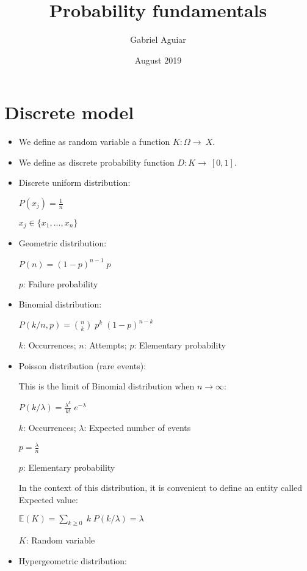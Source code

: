 \documentclass{article}
\title{Probability fundamentals}
\author{Gabriel Aguiar}
\date{August 2019}
\begin{document}
\maketitle

\section{Discrete model}

\begin{itemize}

\item We define as random variable a function $K: \Omega \rightarrow\ X$.

\item We define as discrete probability function $D: K \rightarrow\ [0, 1]$.

\item Discrete uniform distribution:

$P( x_{j} ) = \frac{1}{n}$

$x_{j} \in\{x_{1},..., x_{n}\}$

\item Geometric distribution:

$P(n) = (1 - p)^{n - 1} \; p$

$p$: Failure probability

\item Binomial distribution:

$P(k/n,p) = \binom{n}{k} \; p^{k} \; (1 - p)^{n - k}$

$k$: Occurrences; $n$: Attempts; $p$: Elementary probability

\item Poisson distribution (rare events):

This is the limit of Binomial distribution when $n \rightarrow \infty$:

$P(k/\lambda) = \frac{\lambda^{k}}{k!} \; e^{-\lambda}$

$k$: Occurrences; $\lambda$: Expected number of events

$p = \frac{\lambda}{n}$

$p$: Elementary probability

In the context of this distribution, it is convenient to define an entity called Expected value:

$\mathbb{E}(K) = \sum\limits_{k \geq 0} \; k \; P(k/\lambda) = \lambda$

$K$: Random variable

\item Hypergeometric distribution:


\end{itemize}
\end{document}
